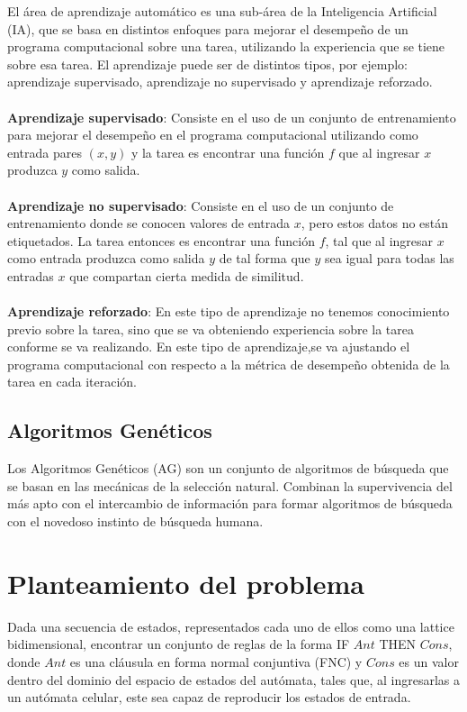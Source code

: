 El área de aprendizaje automático es una sub-área de la Inteligencia Artificial (IA), que se basa en distintos enfoques para mejorar el desempeño de un programa computacional sobre una tarea, utilizando la experiencia que se tiene sobre esa tarea. El aprendizaje puede ser de distintos tipos, por ejemplo: aprendizaje supervisado, aprendizaje no supervisado y aprendizaje reforzado.
\\
\\
\textbf{Aprendizaje supervisado}: Consiste en el uso de un conjunto de entrenamiento para mejorar el desempeño en el programa computacional utilizando como entrada pares $(x,y)$ y la tarea es encontrar una función $f$ que al ingresar $x$ produzca $y$ como salida. 
\\
\\
\textbf{Aprendizaje no supervisado}: Consiste en el uso de un conjunto de entrenamiento donde se conocen valores de entrada $x$, pero estos datos no están etiquetados. La tarea entonces es encontrar una función $f$, tal que al ingresar $x$ como entrada produzca como salida $y$ de tal forma que $y$ sea igual para todas las entradas $x$ que compartan cierta medida de similitud.
\\
\\
\textbf{Aprendizaje reforzado}: En este tipo de aprendizaje no tenemos conocimiento previo sobre la tarea, sino que se va obteniendo experiencia sobre la tarea conforme se va realizando. En este tipo de aprendizaje,se va ajustando el programa computacional con respecto a la métrica de desempeño obtenida de la tarea en cada iteración.

\subsection{Algoritmos Genéticos}

Los Algoritmos Genéticos (AG) son un conjunto de algoritmos de búsqueda que se basan en las mecánicas de la selección natural. Combinan la supervivencia del más apto con el intercambio de información para formar algoritmos de búsqueda con el novedoso instinto de búsqueda humana.  

\section{Planteamiento del problema}

Dada una secuencia de estados, representados cada uno de ellos como una lattice bidimensional, encontrar un conjunto de reglas de la forma IF $Ant$ THEN $Cons$, donde $Ant$ es una cláusula en forma normal conjuntiva (FNC) y $Cons$ es un valor dentro del dominio del espacio de estados del autómata, tales que, al ingresarlas a un autómata celular, este sea capaz de reproducir los estados de entrada.

